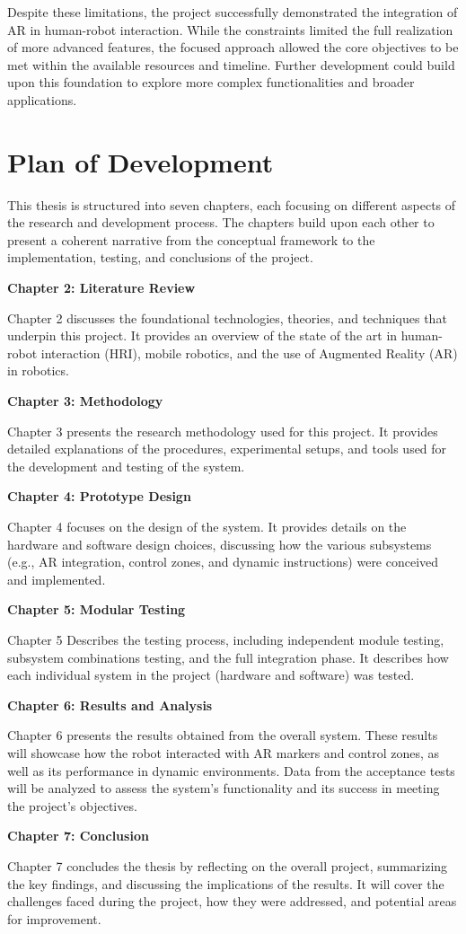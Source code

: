 Despite these limitations, the project successfully demonstrated the integration of AR in human-robot interaction. While the constraints limited the full realization of more advanced features, the focused approach allowed the core objectives to be met within the available resources and timeline. Further development could build upon this foundation to explore more complex functionalities and broader applications.


\section{\label{sec:plan_of_development}Plan of Development}

This thesis is structured into seven chapters, each focusing on different aspects of the research and development process. The chapters build upon each other to present a coherent narrative from the conceptual framework to the implementation, testing, and conclusions of the project.

\textbf{Chapter 2: Literature Review}

Chapter 2 discusses the foundational technologies, theories, and techniques that underpin this project. It provides an overview of the state of the art in human-robot interaction (HRI), mobile robotics, and the use of Augmented Reality (AR) in robotics. 

\textbf{Chapter 3: Methodology}

Chapter 3 presents the research methodology used for this project. It provides detailed explanations of the procedures, experimental setups, and tools used for the development and testing of the system.

\textbf{Chapter 4: Prototype Design}

Chapter 4 focuses on the design of the system. It provides details on the hardware and software design choices, discussing how the various subsystems (e.g., AR integration, control zones, and dynamic instructions) were conceived and implemented. 

\textbf{Chapter 5: Modular Testing}

Chapter 5 Describes the testing process, including independent module testing, subsystem combinations testing, and the full integration phase. It describes how each individual system in the project (hardware and software) was tested.
 

\textbf{Chapter 6: Results and Analysis}

Chapter 6 presents the results obtained from the overall system. These results will showcase how the robot interacted with AR markers and control zones, as well as its performance in dynamic environments. Data from the acceptance tests will be analyzed to assess the system’s functionality and its success in meeting the project’s objectives.

\textbf{Chapter 7: Conclusion}

Chapter 7 concludes the thesis by reflecting on the overall project, summarizing the key findings, and discussing the implications of the results. It will cover the challenges faced during the project, how they were addressed, and potential areas for improvement. 


